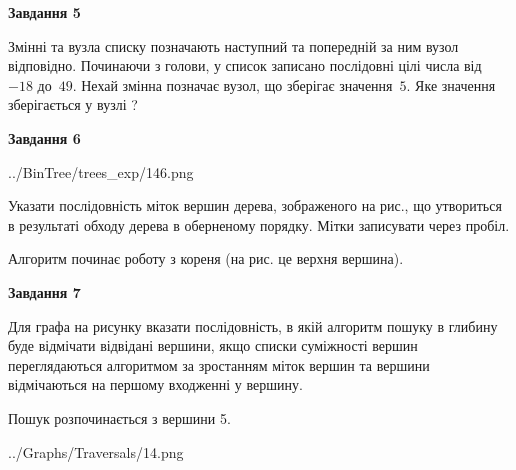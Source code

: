 \documentclass[12pt, ukrainian]{article}
\begin{document}
{\begin {large}
{\begin {center}\textbf{Завдання 5}\end {center}}\par
Змінні  та  вузла списку позначають наступний та попередній за ним вузол відповідно. Починаючи з голови, у список записано послідовні цілі числа від~$-18$ до~$49$. Нехай змінна  позначає вузол, що зберігає значення~$5$.
Яке значення зберігається у вузлі  ?\par
\newpage

{\begin {center}\textbf{Завдання 6}\end {center}}\par

\begin{center}
	{../BinTree/trees_exp/146.png}
\end{center}
Указати послідовність міток вершин дерева, зображеного на рис., що утвориться в результаті обходу дерева в оберненому порядку. Мітки записувати через пробіл.\par Алгоритм починає роботу з кореня (на рис. це верхня вершина).\par
\newpage

{\begin {center}\textbf{Завдання 7}\end {center}}\par
Для графа на рисунку вказати послідовність, в якій алгоритм пошуку в глибину буде відмічати відвідані вершини, якщо списки суміжності вершин переглядаються алгоритмом за зростанням міток вершин та вершини відмічаються на першому вход\-женні у вершину.\par
Пошук розпочинається з вершини 5.\par

\begin{center}
	{../Graphs/Traversals/14.png}
\end{center}\par
\newpage


\end{large}}
\end{document}
